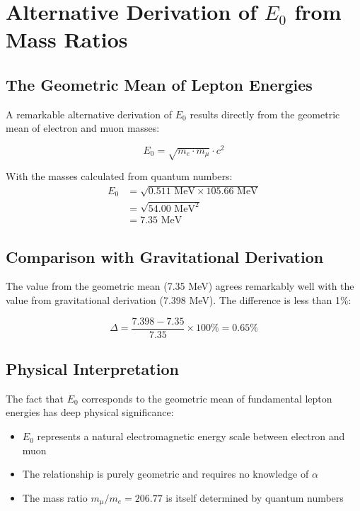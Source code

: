 \documentclass[12pt,a4paper]{article}
\begin{document}
	\section{Alternative Derivation of $E_0$ from Mass Ratios}
	
	\subsection{The Geometric Mean of Lepton Energies}
	
	A remarkable alternative derivation of $E_0$ results directly from the geometric mean of electron and muon masses:
	
	\begin{equation}
		E_0 = \sqrt{m_e \cdot m_\mu} \cdot c^2
	\end{equation}
	
	With the masses calculated from quantum numbers:
	\begin{align}
		E_0 &= \sqrt{0.511 \text{ MeV} \times 105.66 \text{ MeV}}\\
		&= \sqrt{54.00 \text{ MeV}^2}\\
		&= 7.35 \text{ MeV}
	\end{align}
	
	\subsection{Comparison with Gravitational Derivation}
	
	The value from the geometric mean (7.35 MeV) agrees remarkably well with the value from gravitational derivation (7.398 MeV). The difference is less than 1\%:
	
	\begin{equation}
		\Delta = \frac{7.398 - 7.35}{7.35} \times 100\% = 0.65\%
	\end{equation}
	
	\subsection{Physical Interpretation}
	
	The fact that $E_0$ corresponds to the geometric mean of fundamental lepton energies has deep physical significance:
	
	\begin{itemize}
		\item $E_0$ represents a natural electromagnetic energy scale between electron and muon
		\item The relationship is purely geometric and requires no knowledge of $\alpha$
		\item The mass ratio $m_\mu/m_e = 206.77$ is itself determined by quantum numbers
	\end{itemize}
	
\end{document}
